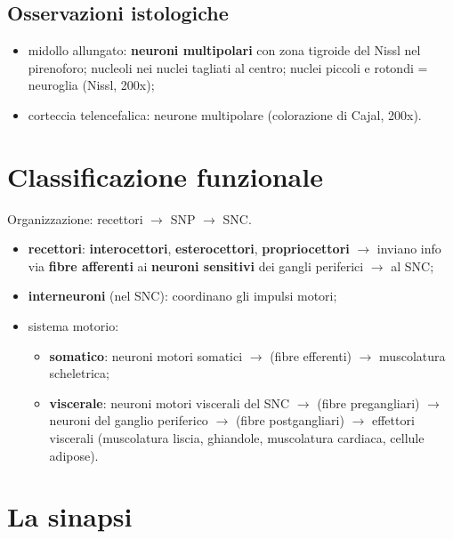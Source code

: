 \subsection{Osservazioni istologiche}
\begin{itemize}
  \item midollo allungato: \textbf{neuroni multipolari} con zona tigroide del Nissl nel pirenoforo;
    nucleoli nei nuclei tagliati al centro; nuclei piccoli e rotondi = neuroglia (Nissl, 200x);
  \item corteccia telencefalica: neurone multipolare (colorazione di Cajal, 200x).
\end{itemize}

\section{Classificazione funzionale}

Organizzazione: recettori $\rightarrow$ SNP $\rightarrow$ SNC.
\begin{itemize}
  \item \textbf{recettori}: \textbf{interocettori}, \textbf{esterocettori}, \textbf{propriocettori}
    $\rightarrow$ inviano info via \textbf{fibre afferenti} ai \textbf{neuroni sensitivi} dei gangli
    periferici $\rightarrow$ al SNC;
  \item \textbf{interneuroni} (nel SNC): coordinano gli impulsi motori;
  \item sistema motorio:
    \begin{itemize}
      \item \textbf{somatico}: neuroni motori somatici $\rightarrow$ (fibre efferenti)
        $\rightarrow$ muscolatura scheletrica;
      \item \textbf{viscerale}: neuroni motori viscerali del SNC $\rightarrow$ (fibre pregangliari)
        $\rightarrow$ neuroni del ganglio periferico $\rightarrow$ (fibre postgangliari)
        $\rightarrow$ effettori viscerali (muscolatura liscia, ghiandole, muscolatura cardiaca,
        cellule adipose).
    \end{itemize}
\end{itemize}

\section{La sinapsi}

